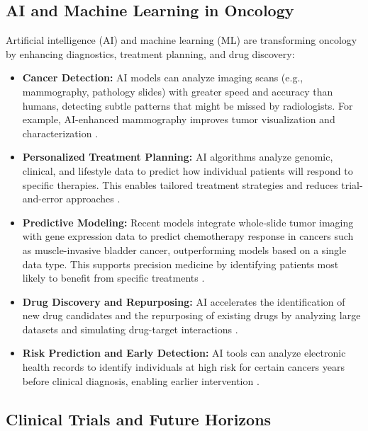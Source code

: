 \subsection{AI and Machine Learning in Oncology}

Artificial intelligence (AI) and machine learning (ML) are transforming oncology by enhancing 
diagnostics, treatment planning, and drug discovery:

\begin{itemize}
    \item \textbf{Cancer Detection:} AI models can analyze imaging scans (e.g., mammography, 
    pathology slides) with greater speed and accuracy than humans, detecting subtle patterns that 
    might be missed by radiologists. For example, AI-enhanced mammography improves tumor 
    visualization and characterization \cite{nlmCitingMedicine2007}.
    
    \item \textbf{Personalized Treatment Planning:} AI algorithms analyze genomic, clinical, and 
    lifestyle data to predict how individual patients will respond to specific therapies. This 
    enables tailored treatment strategies and reduces trial-and-error approaches 
    \cite{nlmCitingMedicine2007, radiopharmaceuticals2024}.
    
    \item \textbf{Predictive Modeling:} Recent models integrate whole-slide tumor imaging with gene 
    expression data to predict chemotherapy response in cancers such as muscle-invasive bladder 
    cancer, outperforming models based on a single data type. This supports precision medicine by 
    identifying patients most likely to benefit from specific treatments 
    \cite{radiopharmaceuticals2024}.
    
    \item \textbf{Drug Discovery and Repurposing:} AI accelerates the identification of new drug 
    candidates and the repurposing of existing drugs by analyzing large datasets and simulating 
    drug-target interactions \cite{clinicalTrialsEurope2025}.
    
    \item \textbf{Risk Prediction and Early Detection:} AI tools can analyze electronic health 
    records to identify individuals at high risk for certain cancers years before clinical 
    diagnosis, enabling earlier intervention \cite{nlmCitingMedicine2007}.
\end{itemize}

\subsection{Clinical Trials and Future Horizons}

